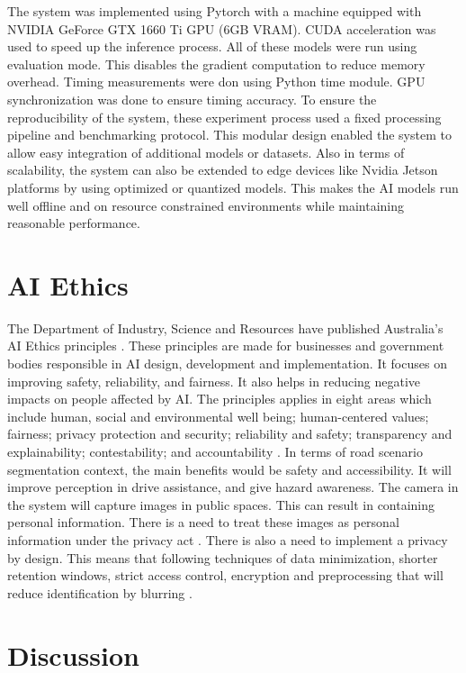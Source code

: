 \documentclass[10pt,journal,compsoc]{IEEEtran}
\begin{document}
The system was implemented using Pytorch with a machine equipped with NVIDIA GeForce GTX 1660 Ti GPU (6GB VRAM). CUDA acceleration was used to speed up the inference process. All of these models were run using evaluation mode. This disables the gradient computation to reduce memory overhead. Timing measurements were don using Python time module. GPU synchronization was done to ensure timing accuracy. To ensure the reproducibility of the system, these experiment process used a fixed processing pipeline and benchmarking protocol. This modular design enabled the system to allow easy integration of additional models or datasets. Also in terms of scalability, the system can also be extended to edge devices like Nvidia Jetson platforms by using optimized or quantized models. This makes the AI models run well offline and on resource constrained environments while maintaining reasonable performance.

\section{AI Ethics}
The Department of Industry, Science and Resources have published Australia's AI Ethics principles \cite{australia2019aiethics, dta2024transparency}. These principles are made for businesses and government bodies responsible in AI design, development and implementation. It focuses on improving safety, reliability, and fairness. It also helps in reducing negative impacts on people affected by AI. The principles applies in eight areas which include human, social and environmental well being; human-centered values; fairness; privacy protection and security; reliability and safety; transparency and explainability; contestability; and accountability \cite{australia2019aiethics, dta2024transparency}. In terms of road scenario segmentation context, the main benefits would be safety and accessibility. It will improve perception in drive assistance, and give hazard awareness. The camera in the system will capture images in public spaces. This can result in containing personal information. There is a need to treat these images as personal information under the privacy act \cite{australia2019aiethics}. There is also a need to implement a privacy by design. This means that following techniques of data minimization, shorter retention windows, strict access control, encryption and preprocessing that will reduce identification by blurring \cite{australia2019aiethics}.

\section{Discussion}
\end{document}
